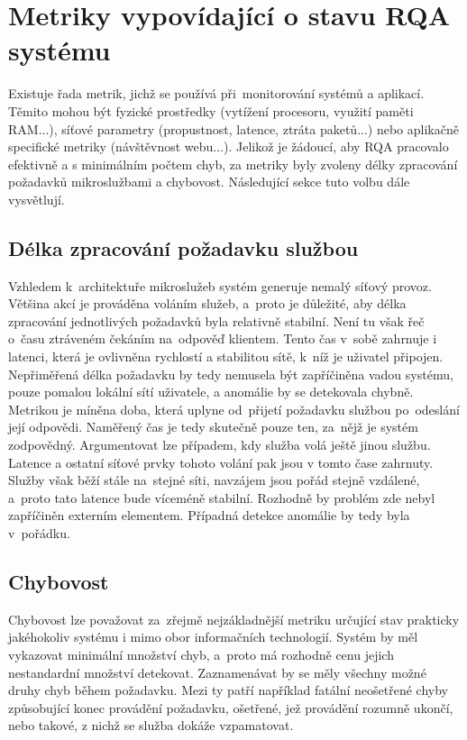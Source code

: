 \section{Metriky vypovídající o stavu RQA systému}
Existuje řada metrik, jichž se používá při~monitorování systémů a aplikací. Těmito mohou být fyzické prostředky (vytížení procesoru, využití paměti RAM...), síťové parametry (propustnost, latence, ztráta paketů...) nebo aplikačně specifické metriky (návštěvnost webu...). Jelikož je žádoucí, aby RQA pracovalo efektivně a s minimálním počtem chyb, za metriky byly zvoleny délky zpracování požadavků mikroslužbami a chybovost. Následující sekce tuto volbu dále vysvětlují.

\subsection{Délka zpracování požadavku službou}
\label{delka-zpracovani-pozadavku}
Vzhledem k~architektuře mikroslužeb systém generuje nemalý síťový provoz. Většina akcí je prováděna voláním služeb, a~proto je důležité, aby délka zpracování jednotlivých požadavků byla relativně stabilní. Není tu však řeč o~času ztráveném čekáním na~odpověď klientem. Tento čas v~sobě zahrnuje i latenci, která je ovlivněna rychlostí a stabilitou sítě, k~níž je uživatel připojen. Nepřiměřená délka požadavku by tedy nemusela být zapříčiněna vadou systému, pouze pomalou lokální sítí uživatele, a anomálie by se detekovala chybně. Metrikou je míněna doba, která uplyne od~přijetí požadavku službou po~odeslání její odpovědi. Naměřený čas je tedy skutečně pouze ten, za~nějž je systém zodpovědný. Argumentovat lze případem, kdy služba volá ještě jinou službu. Latence a ostatní síťové prvky tohoto volání pak jsou v tomto čase zahrnuty. Služby však běží stále na~stejné síti, navzájem jsou pořád stejně vzdálené, a~proto tato latence bude víceméně stabilní. Rozhodně by problém zde nebyl zapříčiněn externím elementem. Případná detekce anomálie by tedy byla v~pořádku.

\subsection{Chybovost}
Chybovost lze považovat za~zřejmě nejzákladnější metriku určující stav prakticky jakéhokoliv systému i mimo obor informačních technologií. Systém by měl vykazovat minimální množství chyb, a~proto má rozhodně cenu jejich nestandardní množství detekovat. Zaznamenávat by se měly všechny možné druhy chyb během požadavku. Mezi ty patří například fatální neošetřené chyby způsobující konec provádění požadavku, ošetřené, jež provádění rozumně ukončí, nebo takové, z nichž se služba dokáže vzpamatovat.

